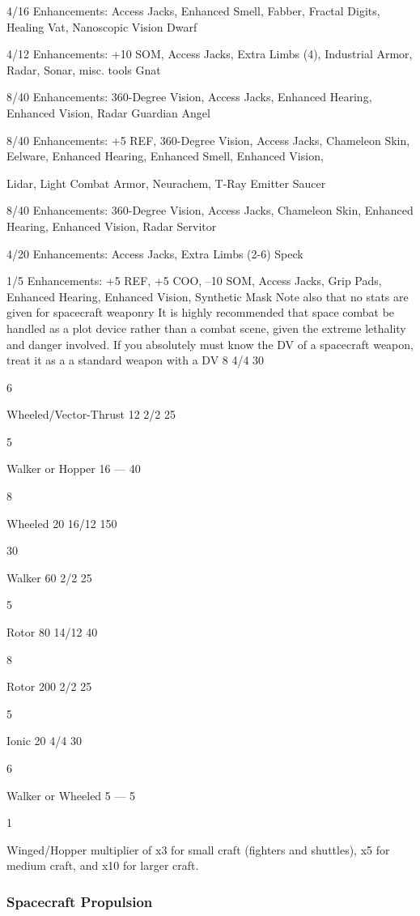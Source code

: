 4/16
Enhancements:\textbf{ }Access Jacks, Enhanced Smell, Fabber, Fractal Digits, Healing Vat, Nanoscopic Vision
Dwarf

4/12
Enhancements:\textbf{ }+10 SOM, Access Jacks, Extra Limbs (4), Industrial Armor, Radar, Sonar, misc. tools
Gnat

8/40
Enhancements:\textbf{ }360-Degree Vision, Access Jacks, Enhanced Hearing, Enhanced Vision, Radar
Guardian Angel

8/40
Enhancements: +5 REF, 360-Degree Vision, Access Jacks, Chameleon Skin, Eelware, Enhanced Hearing, Enhanced Smell, Enhanced Vision, 

Lidar, Light Combat Armor, Neurachem, T-Ray Emitter
Saucer

8/40
Enhancements:\textbf{ }360-Degree Vision, Access Jacks, Chameleon Skin, Enhanced Hearing, Enhanced Vision, Radar
Servitor

4/20
Enhancements:\textbf{ }Access Jacks, Extra Limbs (2-6)
Speck

1/5
Enhancements: +5 REF, +5 COO, –10 SOM, Access Jacks, Grip Pads, Enhanced Hearing, Enhanced Vision, Synthetic Mask
Note also that no stats are given for spacecraft weaponry
It is highly recommended that space combat be
handled as a plot device rather than a combat scene, 
given the extreme lethality and danger involved. 
If you absolutely must know the DV of a spacecraft 
weapon, treat it as a a standard weapon with a DV 
8
4/4
30

6

Wheeled/Vector-Thrust
12
2/2
25

5

Walker or Hopper
16
—
40

8

Wheeled
20
16/12
150

30

Walker
60
2/2
25

5

Rotor
80
14/12
40

8

Rotor
200
2/2
25

5

Ionic
20
4/4
30

6

Walker or Wheeled
5
—
5

1

Winged/Hopper
multiplier of x3 for small craft (fighters and shuttles), 
x5 for medium craft, and x10 for larger craft.

\subsubsection{Spacecraft Propulsion}

